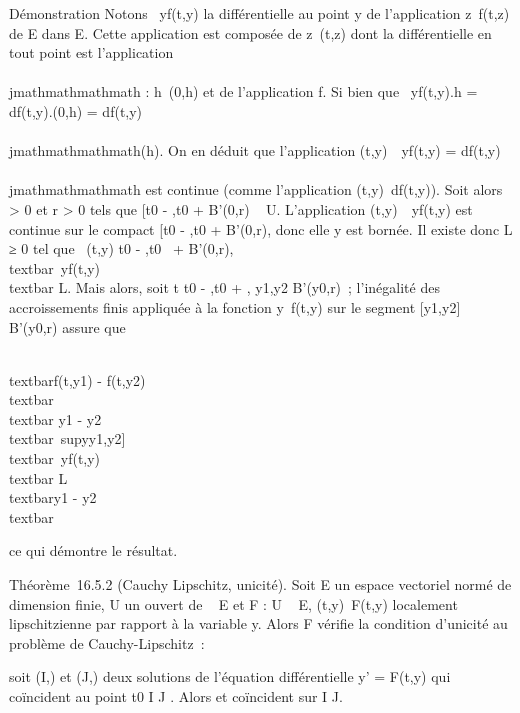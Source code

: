 Démonstration Notons \partial~yf(t,y) la différentielle au point y de
l'application z\mapsto~f(t,z) de E dans E. Cette
application est composée de z\mapsto~(t,z) dont la
différentielle en tout point est l'application \\\\jmathmathmathmath :
h\mapsto~(0,h) et de l'application f. Si bien que
\partial~yf(t,y).h = df(t,y).(0,h) = df(t,y) \cdot \\\\jmathmathmathmath(h). On en déduit que
l'application (t,y)\mapsto~\partial~yf(t,y) =
df(t,y) \cdot \\\\jmathmathmathmath est continue (comme l'application
(t,y)\mapsto~df(t,y)). Soit alors \eta \textgreater{} 0
et r \textgreater{} 0 tels que {[}t0 - \eta,t0 + \eta{]} \times
B'(0,r) \subset~ U. L'application
(t,y)\mapsto~\partial~yf(t,y) est continue sur le
compact {[}t0 - \eta,t0 + \eta{]} \times B'(0,r), donc elle y
est bornée. Il existe donc L ≥ 0 tel que
\forall~(t,y) \in {[}t0 - \eta,t0~ +
\eta{]} \times B'(0,r),
\\textbar{}\partial~yf(t,y)\\textbar{} \leq
L. Mais alors, soit t \in {[}t0 - \eta,t0 + \eta{]},
y1,y2 \in B'(y0,r)~; l'inégalité des
accroissements finis appliquée à la fonction
y\mapsto~f(t,y) sur le segment
{[}y1,y2{]} \subset~ B'(y0,r) assure que

\\textbar{}f(t,y1) -
f(t,y2)\\textbar{} \leq\\textbar{}
y1 -
y2\\textbar{}\
supy\in{[}y1,y2{]}\\textbar{}\partial~yf(t,y)\\textbar{}
\leq L\\textbar{}y1 -
y2\\textbar{}

ce qui démontre le résultat.

Théorème~16.5.2 (Cauchy Lipschitz, unicité). Soit E un espace vectoriel
normé de dimension finie, U un ouvert de \mathbb{R}~ \times E et F : U \rightarrow~ E,
(t,y)\mapsto~F(t,y) localement lipschitzienne par
rapport à la variable y. Alors F vérifie la condition d'unicité au
problème de Cauchy-Lipschitz~:

soit (I,\phi) et (J,\psi) deux solutions de l'équation différentielle y' =
F(t,y) qui coïncident au point t0 \in I \bigcap J . Alors \phi et \psi
coïncident sur I \bigcap J.

